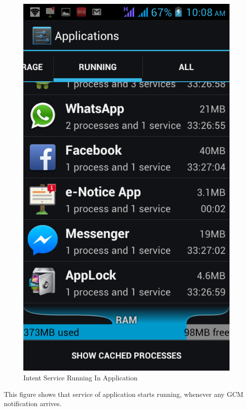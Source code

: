 \begin{figure}[H]
\centering \includegraphics[scale=0.7]{image/service.png}
\caption{Intent Service Running In Application}
\end{figure}

This figure shows that service of application starts running, whenever any GCM notification arrives.

